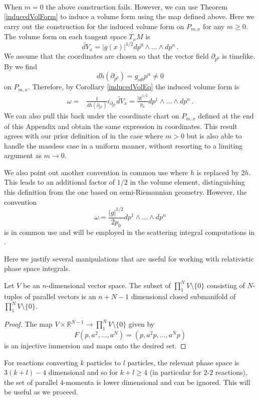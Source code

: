 \\
When $m=0$ the above construction fails. However, we can use Theorem \ref{inducedVolForm} to induce a volume form using the map  defined above. Here we carry out the construction for the induced volume form on $P_{m,x}$ for any $m\geq 0$. The volume form on each tangent space $T_xM$ is
\begin{equation}
\tilde{dV}_x=|g(x)|^{1/2}dp^0\wedge...\wedge dp^n\,.
\end{equation}
We assume that the coordinates are chosen so that the vector field $\partial_{p^0}$ is timelike. By  we find
\begin{equation}
dh(\partial_{p^0})=g_{\alpha 0}p^\alpha\neq 0
\end{equation}
on $P_{m,x}$. Therefore, by Corollary \ref{inducedVolEq} the induced volume form is
\begin{align}\label{massShellVol}
\omega=&\frac{1}{dh(\partial_{p^0})} i_{\partial_{p^0}} \tilde{dV}_x
=\frac{|g|^{1/2}}{p_0}dp^1\wedge...\wedge dp^n\,.
\end{align}
We can also pull this back under the coordinate chart on $P_{m,x}$ defined at the end of this Appendix
and obtain the same expression in coordinates. This result agrees with our prior definition of  in the case where $m>0$ but is also able to handle the massless case in a uniform manner, without resorting to a limiting argument as $m\rightarrow 0$.

We also point out another convention in common use where $h$ is replaced by $2h$. This leads to an additional factor of $1/2$ in the volume element, distinguishing this definition from the one based on semi-Riemannian geometry. However, the convention
\begin{equation}
\omega=\frac{|g|^{1/2}}{2p_0}dp^1\wedge...\wedge dp^n
\end{equation}
 is in common use and will be employed in the scattering integral computations in .

Here we justify several manipulations that are useful for working with relativistic phase space integrals.

\begin{lemma}\label{parallel:lemma}
Let $V$ be an $n$-dimensional vector space. The subset of $\prod_1^N V\setminus\{0\}$ consisting of $N$-tuples of parallel vectors is an $n+N-1$ dimensional closed submanifold of $\prod_1^N V\setminus\{0\}$.
\end{lemma}
\begin{proof}
The map $V\times \mathbb{R}^{N-1}\rightarrow \prod_1^N V\setminus\{0\}$ given by
\begin{equation}
F(p,a^2,...,a^N)=(p,a^2p,...,a^{N}p)
\end{equation}
is an injective immersion and maps onto the desired set.
\end{proof}
For reactions converting $k$ particles to $l$ particles, the relevant phase space is $3(k+l)-4$ dimensional and so for $k+l\geq 4$ (in particular for $2$-$2$ reactions), the set of parallel $4$-momenta is lower dimensional and can be ignored. This will be useful as we proceed.

